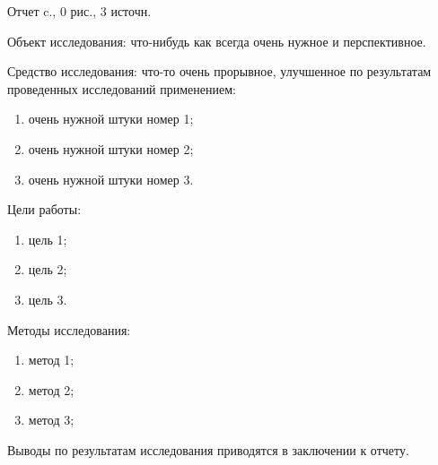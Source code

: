 \newpage{}

Отчет c., 0 рис., 3 источн. 

Объект исследования: что-нибудь как всегда очень нужное и перспективное.

Средство исследования: что-то очень прорывное, улучшенное по результатам проведенных исследований применением:
\begin{enumerate}
	\item очень нужной штуки номер 1; 	
	\item очень нужной штуки номер 2; 	
	\item очень нужной штуки номер 3. 	
\end{enumerate}

Цели работы: 
\begin{enumerate}
	\item цель 1;
	\item цель 2;
	\item цель 3.
\end{enumerate}	

Методы исследования:
\begin{enumerate}
	\item метод 1;
	\item метод 2;
	\item метод 3;
\end{enumerate}

Выводы по результатам исследования приводятся в заключении к отчету.
